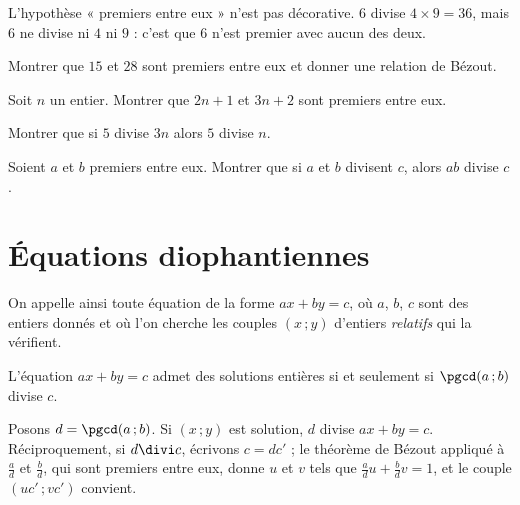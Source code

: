 \begin{avertissement}
L'hypothèse « premiers entre eux » n'est pas décorative. $6$ divise
$4\times9 = 36$, mais $6$ ne divise ni $4$ ni $9$ : c'est que $6$ n'est
premier avec aucun des deux.
\end{avertissement}

\begin{entrainement}
\exo[\niveau{1}] Montrer que $15$ et $28$ sont premiers entre eux et donner
une relation de Bézout.

\exo[\niveau{2}] Soit $n$ un entier. Montrer que $2n+1$ et $3n+2$ sont
premiers entre eux.

\exo[\niveau{2}] Montrer que si $5$ divise $3n$ alors $5$ divise $n$.

\exo[\niveau{3}] Soient $a$ et $b$ premiers entre eux. Montrer que si $a$ et
$b$ divisent $c$, alors $ab$ divise $c$.
\end{entrainement}

\section{Équations diophantiennes}

\begin{definition}
On appelle ainsi toute équation de la forme $ax+by = c$, où $a$, $b$, $c$ sont
des entiers donnés et où l'on cherche les couples $(x\,;y)$ d'entiers
\emph{relatifs} qui la vérifient.
\end{definition}

\begin{theoreme}
L'équation $ax+by = c$ admet des solutions entières si et seulement si
$\pgcd(a\,;b)$ divise $c$.
\end{theoreme}

\begin{demonstration}
Posons $d = \pgcd(a\,;b)$. Si $(x\,;y)$ est solution, $d$ divise $ax+by = c$.
Réciproquement, si $d \divi c$, écrivons $c = dc'$ ; le théorème de Bézout
appliqué à $\frac ad$ et $\frac bd$, qui sont premiers entre eux, donne $u$ et
$v$ tels que $\frac ad u+\frac bd v = 1$, et le couple $(uc'\,;vc')$ convient.
\end{demonstration}

